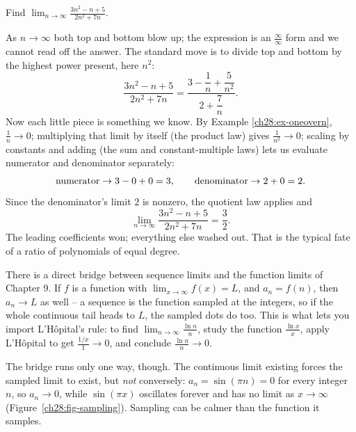 \begin{example}
\label{ch28:ex-rational}
Find $\displaystyle\lim_{n\to\infty} \frac{3n^2 - n + 5}{2n^2 + 7n}$.

As $n \to \infty$ both top and bottom blow up; the expression is an
$\tfrac{\infty}{\infty}$ form and we cannot read off the answer. The standard
move is to divide top and bottom by the highest power present, here $n^2$:
\[
  \frac{3n^2 - n + 5}{2n^2 + 7n}
  = \frac{3 - \dfrac{1}{n} + \dfrac{5}{n^2}}{2 + \dfrac{7}{n}} .
\]
Now each little piece is something we know. By Example
\ref{ch28:ex-oneovern}, $\tfrac1n \to 0$; multiplying that limit by itself (the
product law) gives $\tfrac{1}{n^2} \to 0$; scaling by constants and adding
(the sum and constant-multiple laws) lets us evaluate numerator and denominator
separately:
\[
  \text{numerator} \to 3 - 0 + 0 = 3,
  \qquad
  \text{denominator} \to 2 + 0 = 2 .
\]
Since the denominator's limit $2$ is nonzero, the quotient law applies and
\[
  \lim_{n\to\infty} \frac{3n^2 - n + 5}{2n^2 + 7n} = \frac{3}{2}.
\]
The leading coefficients won; everything else washed out. That is the typical
fate of a ratio of polynomials of equal degree.
\end{example}

\begin{connectionbox}
There is a direct bridge between sequence limits and the function limits of
Chapter 9. If $f$ is a function with $\lim_{x\to\infty} f(x) = L$, and $a_n =
f(n)$, then $a_n \to L$ as well -- a sequence is the function sampled at the
integers, so if the whole continuous tail heads to $L$, the sampled dots do too.
This is what lets you import L'H\^opital's rule: to find $\lim_{n\to\infty}
\tfrac{\ln n}{n}$, study the function $\tfrac{\ln x}{x}$, apply L'H\^opital to get
$\tfrac{1/x}{1} \to 0$, and conclude $\tfrac{\ln n}{n} \to 0$.

The bridge runs only one way, though. The continuous limit existing forces the
sampled limit to exist, but \emph{not} conversely: $a_n = \sin(\pi n) = 0$ for
every integer $n$, so $a_n \to 0$, while $\sin(\pi x)$ oscillates forever and has
no limit as $x \to \infty$ (Figure~\ref{ch28:fig-sampling}). Sampling can be calmer than the function it samples.
\end{connectionbox}

